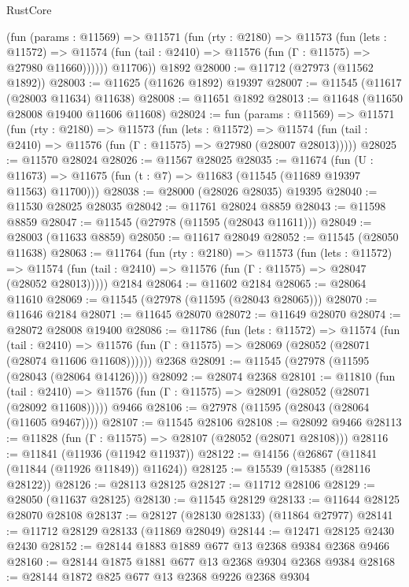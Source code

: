 \begin{lexlean}{RustCore}
\begin{coremodule}
          (fun (params : @11569) =>
          @11571
            (fun (rty : @2180) =>
            @11573
              (fun (lets : @11572) =>
              @11574 (fun (tail : @2410) => @11576 (fun (Γ : @11575) => @27980 @11660))))))
        @11706))
    @1892
@28000 := @11712 (@27973 (@11562 @1892))
@28003 := @11625 (@11626 @1892) @19397
@28007 := @11545 (@11617 (@28003 @11634) @11638)
@28008 := @11651 @1892
@28013 := @11648 (@11650 @28008 @19400 @11606 @11608)
@28024 := fun (params : @11569) =>
  @11571
    (fun (rty : @2180) =>
    @11573
      (fun (lets : @11572) =>
      @11574 (fun (tail : @2410) => @11576 (fun (Γ : @11575) => @27980 (@28007 @28013)))))
@28025 := @11570 @28024
@28026 := @11567 @28025
@28035 := @11674
    (fun (U : @11673) => @11675 (fun (t : @7) => @11683 (@11545 (@11689 @19397 @11563) @11700)))
@28038 := @28000 (@28026 @28035) @19395
@28040 := @11530 @28025 @28035
@28042 := @11761 @28024 @8859
@28043 := @11598 @8859
@28047 := @11545 (@27978 (@11595 (@28043 @11611)))
@28049 := @28003 (@11633 @8859)
@28050 := @11617 @28049
@28052 := @11545 (@28050 @11638)
@28063 := @11764
    (fun (rty : @2180) =>
    @11573
      (fun (lets : @11572) =>
      @11574 (fun (tail : @2410) => @11576 (fun (Γ : @11575) => @28047 (@28052 @28013)))))
    @2184
@28064 := @11602 @2184
@28065 := @28064 @11610
@28069 := @11545 (@27978 (@11595 (@28043 @28065)))
@28070 := @11646 @2184
@28071 := @11645 @28070
@28072 := @11649 @28070
@28074 := @28072 @28008 @19400
@28086 := @11786
    (fun (lets : @11572) =>
    @11574
      (fun (tail : @2410) =>
      @11576 (fun (Γ : @11575) => @28069 (@28052 (@28071 (@28074 @11606 @11608))))))
    @2368
@28091 := @11545 (@27978 (@11595 (@28043 (@28064 @14126))))
@28092 := @28074 @2368
@28101 := @11810
    (fun (tail : @2410) => @11576 (fun (Γ : @11575) => @28091 (@28052 (@28071 (@28092 @11608)))))
    @9466
@28106 := @27978 (@11595 (@28043 (@28064 (@11605 @9467))))
@28107 := @11545 @28106
@28108 := @28092 @9466
@28113 := @11828 (fun (Γ : @11575) => @28107 (@28052 (@28071 @28108)))
@28116 := @11841 (@11936 (@11942 @11937))
@28122 := @14156 (@26867 (@11841 (@11844 (@11926 @11849)) @11624))
@28125 := @15539 (@15385 (@28116 @28122))
@28126 := @28113 @28125
@28127 := @11712 @28106
@28129 := @28050 (@11637 @28125)
@28130 := @11545 @28129
@28133 := @11644 @28125 @28070 @28108
@28137 := @28127 (@28130 @28133) (@11864 @27977)
@28141 := @11712 @28129 @28133 (@11869 @28049)
@28144 := @12471 @28125 @2430 @2430
@28152 := @28144 @1883 @1889 @677 @13 @2368 @9384 @2368 @9466
@28160 := @28144 @1875 @1881 @677 @13 @2368 @9304 @2368 @9384
@28168 := @28144 @1872 @825 @677 @13 @2368 @9226 @2368 @9304

\end{coremodule}
\end{lexlean}
